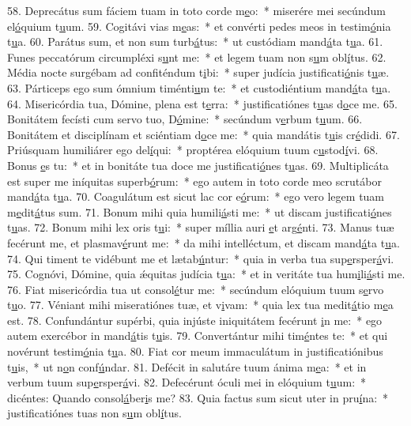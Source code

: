 58. Deprecátus sum fáciem tuam in toto corde m\uline{e}o:~* miserére mei secúndum el\uline{ó}quium t\uline{u}um.
59. Cogitávi vias m\uline{e}as:~* et convérti pedes meos in testim\uline{ó}nia t\uline{u}a.
60. Parátus sum, et non sum turb\uline{á}tus:~* ut custódiam mand\uline{á}ta t\uline{u}a.
61. Funes peccatórum circumpléxi s\uline{u}nt me:~* et legem tuam non s\uline{u}m obl\uline{í}tus.
62. Média nocte surgébam ad confiténdum t\uline{i}bi:~* super judícia justificati\uline{ó}nis t\uline{u}æ.
63. Párticeps ego sum ómnium timénti\uline{u}m te:~* et custodiéntium mand\uline{á}ta t\uline{u}a.
64. Misericórdia tua, Dómine, plena est t\uline{e}rra:~* justificatiónes t\uline{u}as d\uline{o}ce me.
65. Bonitátem fecísti cum servo tuo, D\uline{ó}mine:~* secúndum v\uline{e}rbum t\uline{u}um.
66. Bonitátem et disciplínam et sciéntiam d\uline{o}ce me:~* quia mandátis t\uline{u}is cr\uline{é}didi.
67. Priúsquam humiliárer ego del\uline{í}qui:~* proptérea elóquium tuum c\uline{u}stod\uline{í}vi.
68. Bonus \uline{e}s tu:~* et in bonitáte tua doce me justificati\uline{ó}nes t\uline{u}as.
69. Multiplicáta est super me iníquitas superb\uline{ó}rum:~* ego autem in toto corde meo scrutábor mand\uline{á}ta t\uline{u}a.
70. Coagulátum est sicut lac cor e\uline{ó}rum:~* ego vero legem tuam m\uline{e}dit\uline{á}tus sum.
71. Bonum mihi quia humili\uline{á}sti me:~* ut discam justificati\uline{ó}nes t\uline{u}as.
72. Bonum mihi lex oris t\uline{u}i:~* super míllia auri \uline{e}t arg\uline{é}nti.
73. Manus tuæ fecérunt me, et plasmav\uline{é}runt me:~* da mihi intelléctum, et discam mand\uline{á}ta t\uline{u}a.
74. Qui timent te vidébunt me et lætab\uline{ú}ntur:~* quia in verba tua sup\uline{e}rsper\uline{á}vi.
75. Cognóvi, Dómine, quia ǽquitas judícia t\uline{u}a:~* et in veritáte tua hum\uline{i}li\uline{á}sti me.
76. Fiat misericórdia tua ut consol\uline{é}tur me:~* secúndum elóquium tuum s\uline{e}rvo t\uline{u}o.
77. Véniant mihi miseratiónes tuæ, et v\uline{i}vam:~* quia lex tua medit\uline{á}tio m\uline{e}a est.
78. Confundántur supérbi, quia injúste iniquitátem fecérunt \uline{i}n me:~* ego autem exercébor in mand\uline{á}tis t\uline{u}is.
79. Convertántur mihi tim\uline{é}ntes te:~* et qui novérunt testim\uline{ó}nia t\uline{u}a.
80. Fiat cor meum immaculátum in justificatiónibus t\uline{u}is,~* ut n\uline{o}n conf\uline{ú}ndar.
81. Defécit in salutáre tuum ánima m\uline{e}a:~* et in verbum tuum sup\uline{e}rsper\uline{á}vi.
82. Defecérunt óculi mei in elóquium t\uline{u}um:~* dicéntes: Quando consol\uline{á}ber\uline{i}s me?
83. Quia factus sum sicut uter in pru\uline{í}na:~* justificatiónes tuas non s\uline{u}m obl\uline{í}tus.

